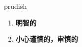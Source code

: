 
\begin{frame}
{\huge prudish}
\begin{center}
\begin{enumerate}\Large
  \item \textbf{明智的}
  \item \textbf{小心谨慎的，审慎的}
\end{enumerate}
\end{center}
\end{frame}
